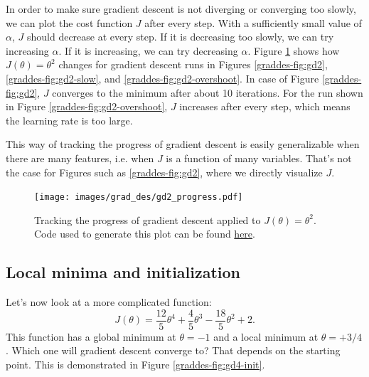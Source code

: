 \documentclass{article}
\theoremstyle{definition}
\begin{document}
In order to make sure gradient descent is not diverging or converging too slowly, we can plot the cost function $J$ after every step. With a sufficiently small value of $\alpha$, $J$ should decrease at every step. If it is decreasing too slowly, we can try increasing $\alpha$. If it is increasing, we can try decreasing $\alpha$. Figure \ref{graddes-fig:gd2-progress} shows how $J(\theta)=\theta^2$ changes for gradient descent runs in Figures \ref{graddes-fig:gd2}, \ref{graddes-fig:gd2-slow}, and \ref{graddes-fig:gd2-overshoot}. In case of Figure \ref{graddes-fig:gd2}, $J$ converges to the minimum after about 10 iterations. For the run shown in Figure \ref{graddes-fig:gd2-overshoot}, $J$ increases after every step, which means the learning rate is too large.

This way of tracking the progress of gradient descent is easily generalizable when there are many features, i.e. when $J$ is a function of many variables. That's not the case for Figures such as \ref{graddes-fig:gd2}, where we directly visualize $J$.

\begin{figure}[ht]
\centering
\texttt{[image: images/grad\_des/gd2\_progress.pdf]}
\caption{Tracking the progress of gradient descent applied to  $J(\theta)=\theta^2$. Code used to generate this plot can be found \href{https://github.com/siavashaslanbeigi/ml_notes/blob/master/src/grad_des/basics.ipynb}{\color{blue} here}.}
\label{graddes-fig:gd2-progress}
\end{figure}


\subsection{Local minima and initialization}
Let's now look at a more complicated function:
\begin{equation}
   J(\theta) = \frac{12}{5} \theta^4 + \frac{4}{5} \theta^3 - \frac{18}{5} \theta^2 + 2.
   \label{graddes-eq:j4}
\end{equation}
This function has a global minimum at $\theta=-1$ and a local minimum at $\theta=+3/4$. Which one will gradient descent converge to? That depends on the starting point. This is demonstrated in Figure \ref{graddes-fig:gd4-init}.
\end{document}
